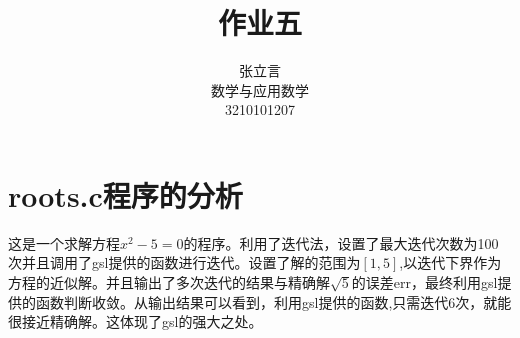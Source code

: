 \documentclass{ctexart}
\begin{document}
\title{作业五}
\author{张立言\\数学与应用数学\\3210101207}
\maketitle

\section{roots.c程序的分析}
这是一个求解方程$x^2-5=0$的程序。利用了迭代法，设置了最大迭代次数为100次并且调用了gsl提供的函数进行迭代。设置了解的范围为$[1,5]$,以迭代下界作为方程的近似解。并且输出了多次迭代的结果与精确解$\sqrt{5}$的误差err，最终利用gsl提供的函数判断收敛。从输出结果可以看到，利用gsl提供的函数,只需迭代6次，就能很接近精确解。这体现了gsl的强大之处。
\end{document}
